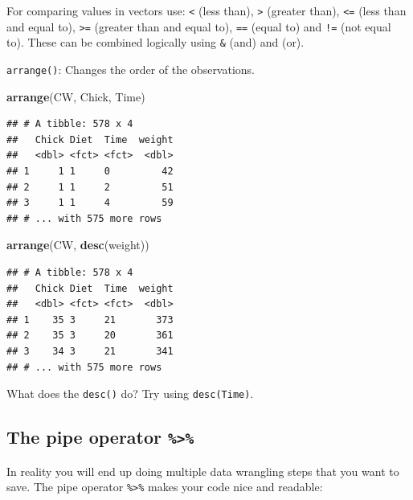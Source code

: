 \documentclass[]{book}
\newenvironment{Shaded}{\begin{snugshade}}{\end{snugshade}}
\newcommand{\KeywordTok}[1]{\textcolor[rgb]{0.13,0.29,0.53}{\textbf{#1}}}
\newcommand{\NormalTok}[1]{#1}
\theoremstyle{definition}
\theoremstyle{definition}
\theoremstyle{definition}
\theoremstyle{remark}
\begin{document}
For comparing values in vectors use: \texttt{\textless{}} (less than), \texttt{\textgreater{}} (greater than), \texttt{\textless{}=}
(less than and equal to), \texttt{\textgreater{}=} (greater than and equal to), \texttt{==} (equal to) and \texttt{!=}
(not equal to). These can be combined logically using \texttt{\&} (and) and \texttt{\textbar{}} (or).

\texttt{arrange()}: Changes the order of the observations.

\begin{Shaded}
\begin{Highlighting}[]
\KeywordTok{arrange}\NormalTok{(CW, Chick, Time)}
\end{Highlighting}
\end{Shaded}

\begin{verbatim}
## # A tibble: 578 x 4
##   Chick Diet  Time  weight
##   <dbl> <fct> <fct>  <dbl>
## 1     1 1     0         42
## 2     1 1     2         51
## 3     1 1     4         59
## # ... with 575 more rows
\end{verbatim}

\begin{Shaded}
\begin{Highlighting}[]
\KeywordTok{arrange}\NormalTok{(CW, }\KeywordTok{desc}\NormalTok{(weight))}
\end{Highlighting}
\end{Shaded}

\begin{verbatim}
## # A tibble: 578 x 4
##   Chick Diet  Time  weight
##   <dbl> <fct> <fct>  <dbl>
## 1    35 3     21       373
## 2    35 3     20       361
## 3    34 3     21       341
## # ... with 575 more rows
\end{verbatim}

What does the \texttt{desc()} do? Try using \texttt{desc(Time)}.

\hypertarget{the-pipe-operator}{%
\subsection{\texorpdfstring{The pipe operator \texttt{\%\textgreater{}\%}}{The pipe operator \%\textgreater{}\%}}\label{the-pipe-operator}}

In reality you will end up doing multiple data wrangling steps that you want to save.
The pipe operator \texttt{\%\textgreater{}\%} makes your code nice and readable:
\end{document}

